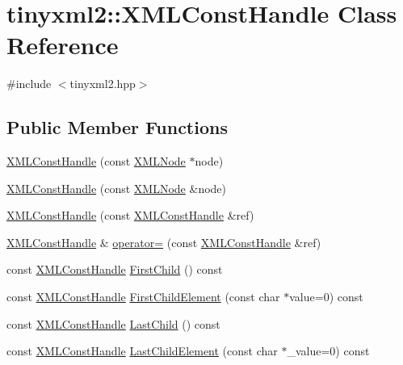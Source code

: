 \hypertarget{classtinyxml2_1_1_x_m_l_const_handle}{\section{tinyxml2\-:\-:X\-M\-L\-Const\-Handle Class Reference}
\label{classtinyxml2_1_1_x_m_l_const_handle}
}


{\ttfamily \#include $<$tinyxml2.\-hpp$>$}

\subsection*{Public Member Functions}
\begin{DoxyCompactItemize}
\item 
\hyperlink{classtinyxml2_1_1_x_m_l_const_handle_a098bda71fa11d7c74ccddab59d5dd534}{X\-M\-L\-Const\-Handle} (const \hyperlink{classtinyxml2_1_1_x_m_l_node}{X\-M\-L\-Node} $\ast$node)
\item 
\hyperlink{classtinyxml2_1_1_x_m_l_const_handle_a8420a0c4720637e0529e78c2e22f2b0b}{X\-M\-L\-Const\-Handle} (const \hyperlink{classtinyxml2_1_1_x_m_l_node}{X\-M\-L\-Node} \&node)
\item 
\hyperlink{classtinyxml2_1_1_x_m_l_const_handle_a639317ad315ff24f4ef0dc69312d7303}{X\-M\-L\-Const\-Handle} (const \hyperlink{classtinyxml2_1_1_x_m_l_const_handle}{X\-M\-L\-Const\-Handle} \&ref)
\item 
\hyperlink{classtinyxml2_1_1_x_m_l_const_handle}{X\-M\-L\-Const\-Handle} \& \hyperlink{classtinyxml2_1_1_x_m_l_const_handle_a2d74c91df1ff9aa5f9b57e3dceddbf94}{operator=} (const \hyperlink{classtinyxml2_1_1_x_m_l_const_handle}{X\-M\-L\-Const\-Handle} \&ref)
\item 
const \hyperlink{classtinyxml2_1_1_x_m_l_const_handle}{X\-M\-L\-Const\-Handle} \hyperlink{classtinyxml2_1_1_x_m_l_const_handle_a64c4ff7074effc1fd181d68d23f9d1e4}{First\-Child} () const 
\item 
const \hyperlink{classtinyxml2_1_1_x_m_l_const_handle}{X\-M\-L\-Const\-Handle} \hyperlink{classtinyxml2_1_1_x_m_l_const_handle_a5c197d0b57f8e560d93356a4a281469c}{First\-Child\-Element} (const char $\ast$value=0) const 
\item 
const \hyperlink{classtinyxml2_1_1_x_m_l_const_handle}{X\-M\-L\-Const\-Handle} \hyperlink{classtinyxml2_1_1_x_m_l_const_handle_afec9a68e7951193bc5a6e876d602f263}{Last\-Child} () const 
\item 
const \hyperlink{classtinyxml2_1_1_x_m_l_const_handle}{X\-M\-L\-Const\-Handle} \hyperlink{classtinyxml2_1_1_x_m_l_const_handle_a1c400e66dace6fdab4927adb21090059}{Last\-Child\-Element} (const char $\ast$\-\_\-value=0) const 

\end{DoxyCompactItemize}
